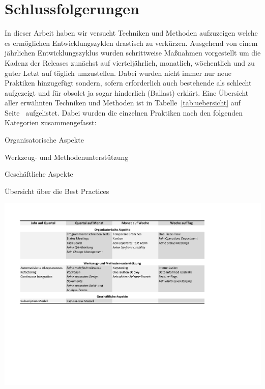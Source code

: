 \section{Schlussfolgerungen}
\label{sec:schlussfolgerungen}

In dieser Arbeit haben wir versucht Techniken und Methoden aufzuzeigen welche
es ermöglichen Entwicklungszyklen drastisch zu verkürzen. Ausgehend von einem
jährlichen Entwicklungszyklus wurden schrittweise Maßnahmen vorgestellt um die
Kadenz der Releases zunächst auf vierteljährlich, monatlich, wöchentlich und
zu guter Letzt auf täglich umzustellen. Dabei wurden nicht immer nur neue
Praktiken hinzugefügt sondern, sofern erforderlich auch bestehende als
schlecht aufgezeigt und für obsolet ja sogar hinderlich (Ballast) erklärt.
Eine Übersicht aller erwähnten Techniken und Methoden ist in
Tabelle~\ref{tab:uebersicht} auf Seite~\pageref{tab:uebersicht} aufgelistet.
Dabei wurden die einzelnen Praktiken nach den folgenden Kategorien zusammengefasst:

\begin{itemize*}
     \item Organisatorische Aspekte
     \item Werkzeug- und Methodenunterstützung
     \item Geschäftliche Aspekte
 \end{itemize*} 

\begin{table}[htbp]
    \centering
        \caption{Übersicht über die Best Practices}
        \includegraphics[trim = 50bp 265bp 185bp 56bp, clip, width=1.00\textwidth]{uebersicht}
    \label{tab:uebersicht}
\end{table}


